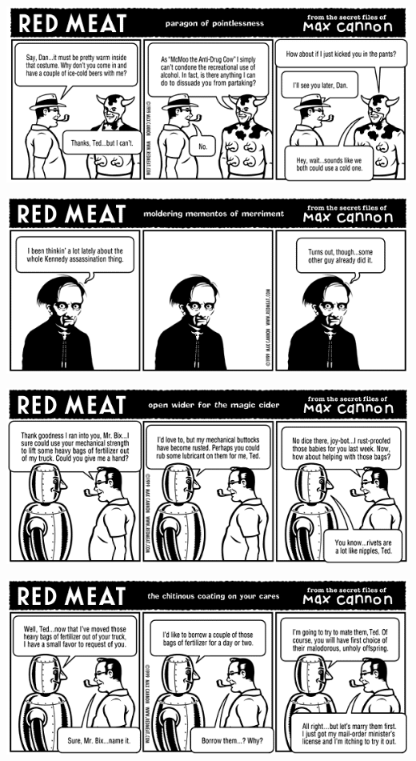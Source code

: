 \documentclass[a4paper,twoside,11pt]{article}
\begin{document}
\includegraphics[width=\textwidth]{redmeat_1999-07-05.png}



\includegraphics[width=\textwidth]{redmeat_1999-07-12.png}



\includegraphics[width=\textwidth]{redmeat_1999-07-19.png}



\includegraphics[width=\textwidth]{redmeat_1999-07-26.png}
\end{document}
